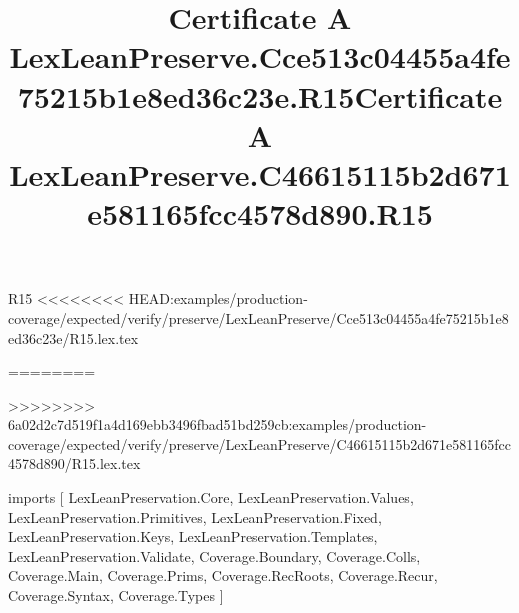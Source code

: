\begin{lexlean}{R15}
<<<<<<<< HEAD:examples/production-coverage/expected/verify/preserve/LexLeanPreserve/Cce513c04455a4fe75215b1e8ed36c23e/R15.lex.tex
\title{Certificate A LexLeanPreserve.Cce513c04455a4fe75215b1e8ed36c23e.R15}
========
\title{Certificate A LexLeanPreserve.C46615115b2d671e581165fcc4578d890.R15}
>>>>>>>> 6a02d2c7d519f1a4d169ebb3496fbad51bd259cb:examples/production-coverage/expected/verify/preserve/LexLeanPreserve/C46615115b2d671e581165fcc4578d890/R15.lex.tex
\begin{coremodule}
imports [
  LexLeanPreservation.Core,
  LexLeanPreservation.Values,
  LexLeanPreservation.Primitives,
  LexLeanPreservation.Fixed,
  LexLeanPreservation.Keys,
  LexLeanPreservation.Templates,
  LexLeanPreservation.Validate,
  Coverage.Boundary,
  Coverage.Colls,
  Coverage.Main,
  Coverage.Prims,
  Coverage.RecRoots,
  Coverage.Recur,
  Coverage.Syntax,
  Coverage.Types
]


\end{coremodule}
\end{lexlean}
